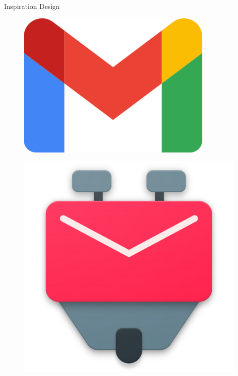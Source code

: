 \documentclass[aspectratio=169]{beamer}
\begin{document}
\begin{frame}[plain]{Inspiration Design}
\begin{varwidth}{.3\textwidth}\pause
        \begin{figure}
            \centering
            \includegraphics[width=.9\textwidth]{media/gmail-logo.png}
        \end{figure}
    \end{varwidth}
    \hfill
    \begin{varwidth}{.3\textwidth}\pause
        \begin{figure}
        \centering
        \includegraphics[width=.9\textwidth]{media/k9-logo.png}

\end{figure}
\end{varwidth}
\end{frame}
\end{document}
